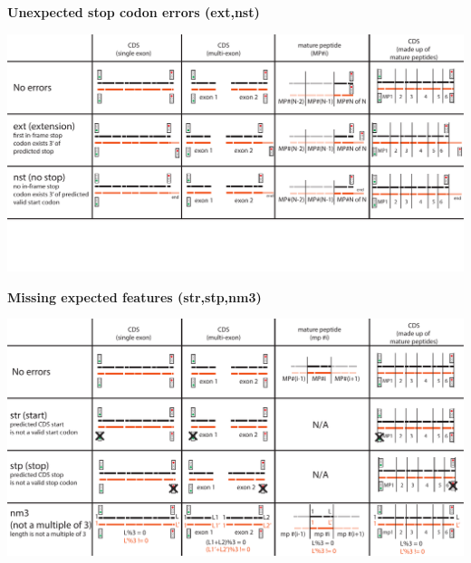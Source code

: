 \documentclass[landscape]{slides}
\begin{document}
\begin{slide}
\begin{center}
\textbf{Unexpected stop codon errors (ext,nst)}
\vspace{0.5in}

\includegraphics[width=10in]{figs/error-2-ext-nst}
\end{center}
\vfill
\end{slide}
\begin{slide}
\begin{center}
\textbf{Missing expected features (str,stp,nm3)}
\vspace{0.5in}

\includegraphics[width=10in]{figs/error-3-str-stp-nm3}
\end{center}
\vfill
\end{slide}
\end{document}
